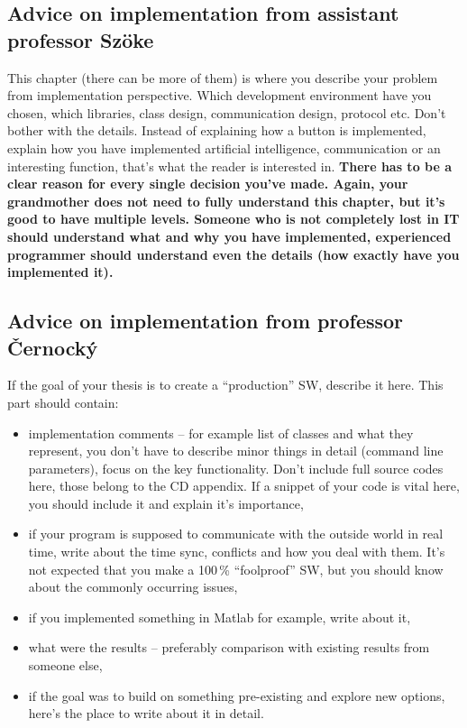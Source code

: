 \subsection{Advice on implementation from assistant professor Szöke}
This chapter (there can be more of them) is where you describe your problem from implementation perspective. Which development environment have you chosen, which libraries, class design, communication design, protocol etc. Don't bother with the details. Instead of explaining how a button is implemented, explain how you have implemented artificial intelligence, communication or an interesting function, that's what the reader is interested in. \bf There has to be a clear reason for every single decision you've made. \rm Again, your grandmother does not need to fully understand this chapter, but it's good to have multiple levels. Someone who is not completely lost in IT should understand what and why you have implemented, experienced programmer should understand even the details (how exactly have you implemented it).

\subsection{Advice on implementation from professor Černocký}

If the goal of your thesis is to create a ``production'' SW, describe it here. This part should contain: 
\begin{itemize}
  \item{implementation comments -- for example list of classes and what they represent, you don't have to describe minor things in detail (command line parameters), focus on the key functionality. Don't include full source codes here, those belong to the CD appendix. If a snippet of your code is vital here, you should include it and explain it's importance,}
  \item{if your program is supposed to communicate with the outside world in real time, write about the time sync, conflicts and how you deal with them. It's not expected that you make a 100\,\% ``foolproof'' SW, but you should know about the commonly occurring issues,}
  \item{if you implemented something in Matlab for example, write about it,}
  \item{what were the results -- preferably comparison with existing results from someone else,}
  \item{if the goal was to build on something pre-existing and explore new options, here's the place to write about it in detail.}
\end{itemize}

